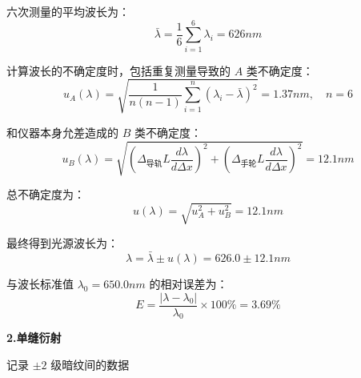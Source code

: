 \documentclass{Phyport}
\begin{document}
\FloatBarrier

六次测量的平均波长为：
\[
\bar{\lambda} = \frac{1}{6} \sum_{i=1}^6 \lambda_i = 626 nm
\]

计算波长的不确定度时，包括重复测量导致的 $A$ 类不确定度：
\[
u_A(\lambda) = \sqrt{\frac{1}{n(n-1)} \sum_{i=1}^{n} (\lambda_i - \bar{\lambda})^2} = 1.37 nm , \quad n = 6
\]

和仪器本身允差造成的 $B$ 类不确定度：
\[
u_B(\lambda) = \sqrt{ (\Delta_{\text{导轨}} L \frac{d \lambda}{d \Delta x})^2 + (\Delta_{\text{手轮}} L \frac{d \lambda}{d \Delta x})^2 } = 12.1 nm
\]

总不确定度为：
\[
u(\lambda) = \sqrt{u_A^2 + u_B^2} = 12.1 nm
\]

最终得到光源波长为：
\[
\lambda = \bar{\lambda} \pm u(\lambda) = 626.0 \pm 12.1 nm
\]

与波长标准值 $\lambda_0 = 650.0 nm$ 的相对误差为：
\[
E = \frac{|\lambda - \lambda_0|}{\lambda_0} \times 100 \% = 3.69 \%
\]

\textbf{2.单缝衍射}

记录 $\pm 2$ 级暗纹间的数据
\end{document}
